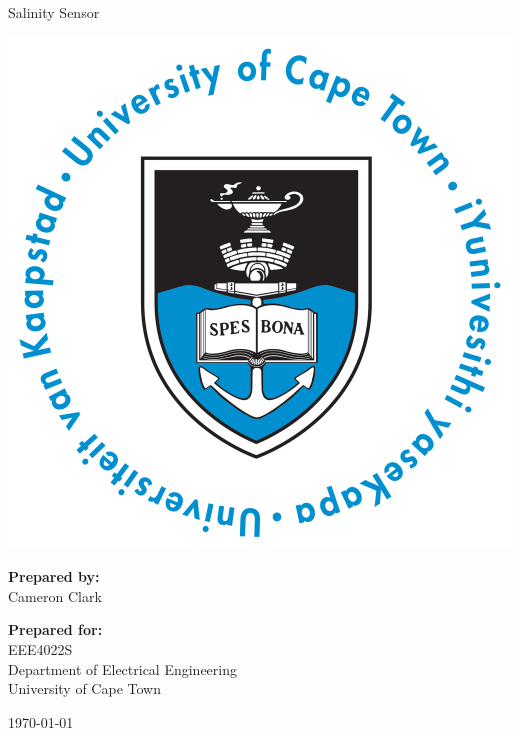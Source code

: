 \thispagestyle{empty}
\begin{center}
    
\Huge

\vspace{5cm}

Salinity Sensor

\vspace{2.5cm}

\includegraphics[width=0.4\linewidth]{FrontMatter/UCT_logo}

\vfill

\large
\textbf{Prepared by:}\\
Cameron Clark

\vspace{1cm}

\textbf{Prepared for:}\\
EEE4022S\\
Department of Electrical Engineering\\
University of Cape Town

\vspace{2cm}

\today


\end{center}